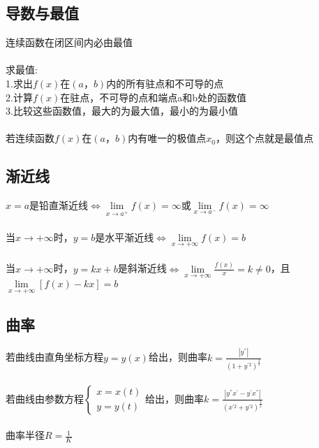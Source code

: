 \documentclass{article}
\begin{document}
\begin{flushleft}
	\subsection{导数与最值}
	
	连续函数在闭区间内必由最值\\
	~\\
	求最值:\\
	1.求出$f(x)$在$(a，b)$内的所有驻点和不可导的点\\
	2.计算$f(x)$在驻点，不可导的点和端点a和b处的函数值\\
	3.比较这些函数值，最大的为最大值，最小的为最小值\\
	~\\
	若连续函数$f(x)$在$(a，b)$内有唯一的极值点$x_0$，则这个点就是最值点\\
	
	\subsection{渐近线}
	
	$x=a$是铅直渐近线$\Leftrightarrow \lim\limits_{x\to a^+}f(x)=\infty$或$\lim\limits_{x\to a^-}f(x)=\infty$\\
	~\\
	当$x\to +\infty$时，$y=b$是水平渐近线$\Leftrightarrow \lim\limits_{x\to +\infty}f(x)=b$\\
	~\\
	当$x\to +\infty$时，$y=kx+b$是斜渐近线$\Leftrightarrow \lim\limits_{x\to +\infty}\frac{f(x)}{x}=k\neq 0$，且$\lim\limits_{x\to +\infty}[f(x)-kx]=b$\\
	
	\subsection{曲率}
	
	若曲线由直角坐标方程$y=y(x)$给出，则曲率$k=\frac{|y^{''}|}{(1+y^{'2})^{\frac{3}{2}}}$\\
	~\\
	若曲线由参数方程$\left\{
	\begin{array}{rcl}
	x=x(t)\\
	y=y(t)
	\end{array} \right.$给出，则曲率$k=\frac{|y^{''}x^{'}-y^{'}x^{''}|}{(x^{'2}+y^{'2})^{\frac{3}{2}}}$\\
	~\\
	曲率半径$R=\frac{1}{K}$\\
	
\end{flushleft}
\end{document}
